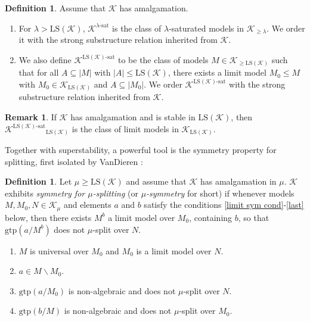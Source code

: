 \documentclass[12pt]{amsart}
\theoremstyle{definition}
\newtheorem{defin}[mydef]{Definition}
\newtheorem{remark}[mydef]{Remark}
\begin{document}
\begin{defin}\label{ksat-def}
  Assume that ${\mathcal{K}}$ has amalgamation. 

  \begin{enumerate}
    \item For $\lambda > {\text{LS}} ({\mathcal{K}})$, ${{{{\mathcal{K}}}^{{{\lambda}}\text{-sat}}}}$ is the class of $\lambda$-saturated models in ${\mathcal{K}}_{\ge \lambda}$. We order it with the strong substructure relation inherited from ${\mathcal{K}}$.
    \item We also define ${{{{\mathcal{K}}}^{{{{\text{LS}} ({\mathcal{K}})}}\text{-sat}}}}$ to be the class of models $M \in {\mathcal{K}}_{\ge {\text{LS}} ({\mathcal{K}})}$ such that for all $A \subseteq |M|$ with $|A| \le {\text{LS}} ({\mathcal{K}})$, there exists a limit model $M_0 {\le} M$ with $M_0 \in {\mathcal{K}}_{{\text{LS}} ({\mathcal{K}})}$ and $A \subseteq |M_0|$. We order ${{{{\mathcal{K}}}^{{{{\text{LS}} ({\mathcal{K}})}}\text{-sat}}}}$ with the strong substructure relation inherited from ${\mathcal{K}}$.
  \end{enumerate}
\end{defin}
\begin{remark}
  If ${\mathcal{K}}$ has amalgamation and is stable in ${\text{LS}} ({\mathcal{K}})$, then ${{{{\mathcal{K}}}^{{{{\text{LS}} ({\mathcal{K}})}}\text{-sat}}}}_{{\text{LS}} ({\mathcal{K}})}$ is the class of limit models in ${\mathcal{K}}_{{\text{LS}} ({\mathcal{K}})}$.
\end{remark}

Together with superstability, a powerful tool is the symmetry property for splitting, first isolated by VanDieren \cite{vandieren-symmetry-v1}:
\begin{defin}\label{sym defn}
Let $\mu \ge {\text{LS}} ({\mathcal{K}})$ and assume that ${\mathcal{K}}$ has amalgamation in $\mu$. ${\mathcal{K}}$ exhibits \emph{symmetry for $\mu$-splitting} (or \emph{$\mu$-symmetry} for short) if  whenever models $M,M_0,N\in{\mathcal{K}}_\mu$ and elements $a$ and $b$  satisfy the conditions \ref{limit sym cond}-\ref{last} below, then there exists  $M^b$  a limit model over $M_0$, containing $b$, so that ${\text{gtp}}(a/M^b)$ does not $\mu$-split over $N$.
\begin{enumerate} 
\item\label{limit sym cond} $M$ is universal over $M_0$ and $M_0$ is a limit model over $N$.
\item\label{a cond}  $a\in M\backslash M_0$.
\item\label{a non-split} ${\text{gtp}}(a/M_0)$ is non-algebraic and does not $\mu$-split over $N$.
\item\label{last} ${\text{gtp}}(b/M)$ is non-algebraic and does not $\mu$-split over $M_0$. 
\end{enumerate}
\end{defin}
\end{document}
